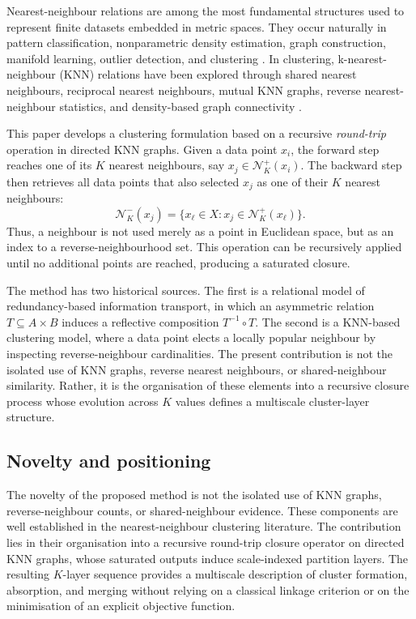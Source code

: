 \documentclass[pdflatex,sn-mathphys-num]{sn-jnl}
\newcommand{\calN}{\mathcal{N}}
\begin{document}
Nearest-neighbour relations are among the most fundamental structures used to represent finite datasets embedded in metric spaces. They occur naturally in pattern classification, nonparametric density estimation, graph construction, manifold learning, outlier detection, and clustering \citep{CoverHart1967,LoftsgaardenQuesenberry1965,Bentley1975,FriedmanBentleyFinkel1977,VonLuxburg2007}. In clustering, k-nearest-neighbour (KNN) relations have been explored through shared nearest neighbours, reciprocal nearest neighbours, mutual KNN graphs, reverse nearest-neighbour statistics, and density-based graph connectivity \citep{JarvisPatrick1973,ErtozSteinbachKumar2003,BritoChavezQuirozYukich1997,GowdaKrishna1978,ChowdhuryAmorim2018,XieLeeWangChenZhou2019}.

This paper develops a clustering formulation based on a recursive \emph{round-trip} operation in directed KNN graphs. Given a data point $x_i$, the forward step reaches one of its $K$ nearest neighbours, say $x_j\in\calN_K^+(x_i)$. The backward step then retrieves all data points that also selected $x_j$ as one of their $K$ nearest neighbours:
\begin{equation}
\calN_K^-(x_j)=\{x_\ell\in X: x_j\in\calN_K^+(x_\ell)\}.
\end{equation}
Thus, a neighbour is not used merely as a point in Euclidean space, but as an index to a reverse-neighbourhood set. This operation can be recursively applied until no additional points are reached, producing a saturated closure.

The method has two historical sources. The first is a relational model of redundancy-based information transport, in which an asymmetric relation $T\subseteq A\times B$ induces a reflective composition $T^{-1}\circ T$. The second is a KNN-based clustering model, where a data point elects a locally popular neighbour by inspecting reverse-neighbour cardinalities. The present contribution is not the isolated use of KNN graphs, reverse nearest neighbours, or shared-neighbour similarity. Rather, it is the organisation of these elements into a recursive closure process whose evolution across $K$ values defines a multiscale cluster-layer structure.

\subsection{Novelty and positioning}

The novelty of the proposed method is not the isolated use of KNN graphs, reverse-neighbour counts, or shared-neighbour evidence. These components are well established in the nearest-neighbour clustering literature. The contribution lies in their organisation into a recursive round-trip closure operator on directed KNN graphs, whose saturated outputs induce scale-indexed partition layers. The resulting $K$-layer sequence provides a multiscale description of cluster formation, absorption, and merging without relying on a classical linkage criterion or on the minimisation of an explicit objective function.
\end{document}
